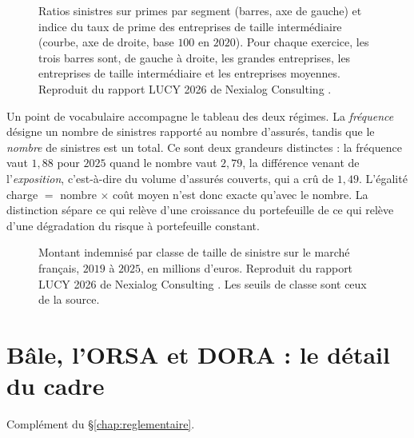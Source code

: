 \begin{figure}[htbp]
\centering
{}
\caption[Divergence entre prix et risque par segment]{Ratios sinistres sur primes par segment
(barres, axe de gauche) et indice du taux de prime des entreprises de taille intermédiaire
(courbe, axe de droite, base $100$ en $2020$). Pour chaque exercice, les trois barres sont, de
gauche à droite, les grandes entreprises, les entreprises de taille intermédiaire et les
entreprises moyennes. Reproduit du rapport LUCY 2026 de Nexialog Consulting
\citep{RapiorKaddouri2026}.}
\label{fig:lucy-divergence}
\end{figure}

\vspace{2pt}
\noindent Un point de vocabulaire accompagne le tableau des deux régimes. La \emph{fréquence} désigne un nombre de
sinistres rapporté au nombre d'assurés, tandis que le \emph{nombre} de sinistres est un total. Ce
sont deux grandeurs distinctes : la fréquence vaut $1{,}88$ pour $2025$ quand le nombre vaut
$2{,}79$, la différence venant de l'\emph{exposition}, c'est-à-dire du volume d'assurés couverts,
qui a crû de $1{,}49$. L'égalité charge $=$ nombre $\times$ coût moyen n'est donc exacte qu'avec
le nombre. La distinction sépare ce qui relève d'une croissance du portefeuille de ce qui relève
d'une dégradation du risque à portefeuille constant.

\begin{figure}[htbp]
\centering
{}
\caption[Montant indemnisé par classe de taille de sinistre]{Montant indemnisé par classe de
taille de sinistre sur le marché français, $2019$ à $2025$, en millions d'euros. Reproduit du
rapport LUCY 2026 de Nexialog Consulting \citep{RapiorKaddouri2026}. Les seuils de classe sont
ceux de la source.}
\label{fig:lucy-taille}
\end{figure}

\section{Bâle, l'ORSA et DORA : le détail du cadre}
\label{sec:ann-reglementaire}


Complément du \S\ref{chap:reglementaire}.

